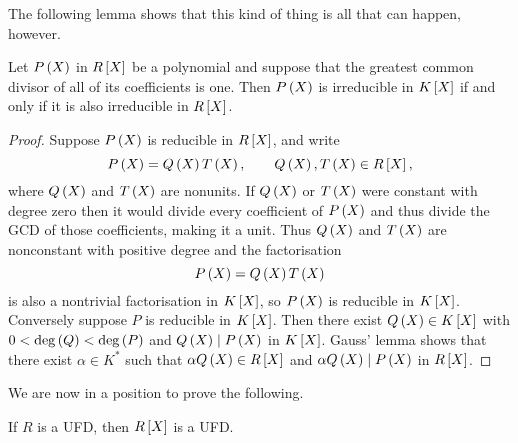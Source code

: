 The following lemma shows that this kind of thing is all that can happen, however.

\begin{proposition}
Let $ P\br{X} $ in $ R\sbr{X} $ be a polynomial and suppose that the greatest common divisor of all of its coefficients is one. Then $ P\br{X} $ is irreducible in $ K\sbr{X} $ if and only if it is also irreducible in $ R\sbr{X} $.
\end{proposition}

\pagebreak

\begin{proof}
Suppose $ P\br{X} $ is reducible in $ R\sbr{X} $, and write
$$ P\br{X} = Q\br{X}T\br{X}, \qquad Q\br{X}, T\br{X} \in R\sbr{X}, $$
where $ Q\br{X} $ and $ T\br{X} $ are nonunits. If $ Q\br{X} $ or $ T\br{X} $ were constant with degree zero then it would divide every coefficient of $ P\br{X} $ and thus divide the GCD of those coefficients, making it a unit. Thus $ Q\br{X} $ and $ T\br{X} $ are nonconstant with positive degree and the factorisation
$$ P\br{X} = Q\br{X}T\br{X} $$
is also a nontrivial factorisation in $ K\sbr{X} $, so $ P\br{X} $ is reducible in $ K\sbr{X} $. Conversely suppose $ P $ is reducible in $ K\sbr{X} $. Then there exist $ Q\br{X} \in K\sbr{X} $ with $ 0 < \deg\br{Q} < \deg\br{P} $ and $ Q\br{X} \mid P\br{X} $ in $ K\sbr{X} $. Gauss' lemma shows that there exist $ \alpha \in K^* $ such that $ \alpha Q\br{X} \in R\sbr{X} $ and $ \alpha Q\br{X} \mid P\br{X} $ in $ R\sbr{X} $.
\end{proof}

We are now in a position to prove the following.

\begin{theorem}
If $ R $ is a UFD, then $ R\sbr{X} $ is a UFD.
\end{theorem}

